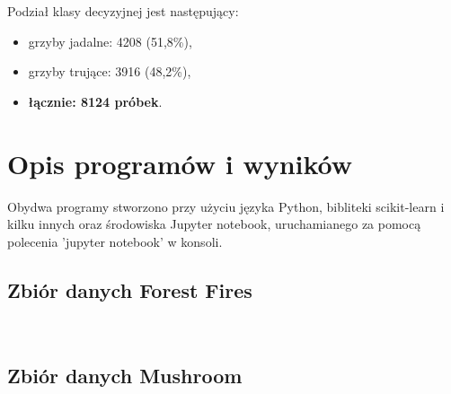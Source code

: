 \documentclass[10pt,a4paper]{article}
\begin{document}
Podział klasy decyzyjnej jest następujący:
\begin{itemize}[label=-]
	\item grzyby jadalne: 4208 (51,8\%),
	\item grzyby trujące: 3916 (48,2\%),
	\item \textbf{łącznie: 8124 próbek}.
\end{itemize}
\section{Opis programów i wyników}
Obydwa programy stworzono przy użyciu języka Python, bibliteki scikit-learn i kilku innych oraz środowiska Jupyter notebook, uruchamianego za pomocą polecenia 'jupyter notebook' w konsoli.
\subsection{Zbiór danych Forest Fires}
~
\vskip 2in

\subsection{Zbiór danych Mushroom}
~
\newpage
\setcounter{page}{25}
~
\end{document}
